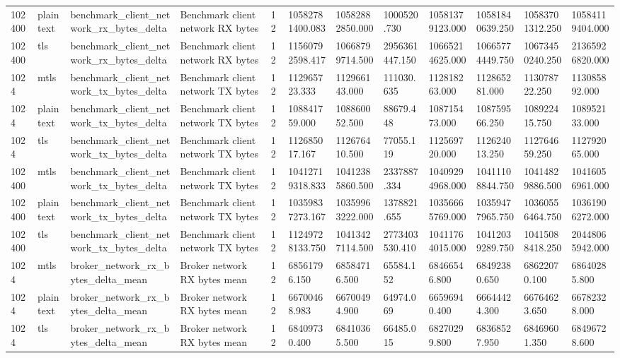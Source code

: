 \begin{longtable}{llllllllllll}
102400 & plaintext & benchmark\_client\_network\_rx\_bytes\_delta & Benchmark client network RX bytes & 12 & 10582781400.083 & 10582882850.000 & 1000520.730 & 10581379123.000 & 10581840639.250 & 10583701312.250 & 10584119404.000 \\
102400 & tls & benchmark\_client\_network\_rx\_bytes\_delta & Benchmark client network RX bytes & 12 & 11560792598.417 & 10668799714.500 & 2956361447.150 & 10665214625.000 & 10665774449.750 & 10673450240.250 & 21365926820.000 \\
1024 & mtls & benchmark\_client\_network\_tx\_bytes\_delta & Benchmark client network TX bytes & 12 & 112965723.333 & 112966143.000 & 111030.635 & 112818263.000 & 112865281.000 & 113078722.250 & 113085892.000 \\
1024 & plaintext & benchmark\_client\_network\_tx\_bytes\_delta & Benchmark client network TX bytes & 12 & 108841759.000 & 108860052.500 & 88679.448 & 108715473.000 & 108759566.250 & 108922415.750 & 108952133.000 \\
1024 & tls & benchmark\_client\_network\_tx\_bytes\_delta & Benchmark client network TX bytes & 12 & 112685017.167 & 112676410.500 & 77055.119 & 112569720.000 & 112624013.250 & 112764659.250 & 112792065.000 \\
102400 & mtls & benchmark\_client\_network\_tx\_bytes\_delta & Benchmark client network TX bytes & 12 & 10412719318.833 & 10412385860.500 & 2337887.334 & 10409294968.000 & 10411108844.750 & 10414829886.500 & 10416056961.000 \\
102400 & plaintext & benchmark\_client\_network\_tx\_bytes\_delta & Benchmark client network TX bytes & 12 & 10359837273.167 & 10359963222.000 & 1378821.655 & 10356665769.000 & 10359477965.750 & 10360556464.750 & 10361906272.000 \\
102400 & tls & benchmark\_client\_network\_tx\_bytes\_delta & Benchmark client network TX bytes & 12 & 11249728133.750 & 10413427114.500 & 2773403530.410 & 10411764015.000 & 10412039289.750 & 10415088418.250 & 20448065942.000 \\
1024 & mtls & broker\_network\_rx\_bytes\_delta\_mean & Broker network RX bytes mean & 12 & 68561796.150 & 68584716.500 & 65584.152 & 68466546.800 & 68492380.650 & 68622070.100 & 68640285.800 \\
1024 & plaintext & broker\_network\_rx\_bytes\_delta\_mean & Broker network RX bytes mean & 12 & 66700468.983 & 66700494.900 & 64974.069 & 66596940.400 & 66644424.300 & 66764623.650 & 66782328.000 \\
1024 & tls & broker\_network\_rx\_bytes\_delta\_mean & Broker network RX bytes mean & 12 & 68409730.400 & 68410365.500 & 66485.015 & 68270299.800 & 68368527.950 & 68469601.350 & 68496728.600 \\

\end{longtable}

